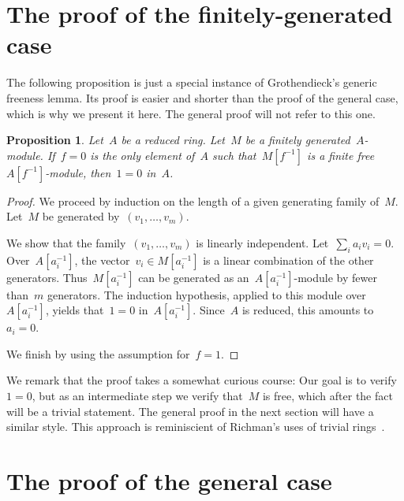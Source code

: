 \documentclass[oneside]{amsart}
\theoremstyle{definition}
\theoremstyle{plain}
\newtheorem{prop}[defn]{Proposition}
\theoremstyle{remark}
\begin{document}
\section{The proof of the finitely-generated case}

The following proposition is just a special instance of Grothendieck's generic
freeness lemma. Its proof is easier and shorter than the proof of the general
case, which is why we present it here. The general proof
will not refer to this one.

\begin{prop}Let~$A$ be a reduced ring. Let~$M$ be a finitely
generated~$A$-module. If~$f = 0$ is the only element of~$A$ such
that~$M[f^{-1}]$ is a finite free~$A[f^{-1}]$-module, then~$1 = 0$ in~$A$.
\end{prop}

\begin{proof}We proceed by induction on the length of a given generating family
of~$M$. Let~$M$ be generated by~$(v_1,\ldots,v_m)$.

We show that the family~$(v_1,\ldots,v_m)$ is linearly independent. Let~$\sum_i
a_i v_i = 0$. Over~$A[a_i^{-1}]$, the vector~$v_i \in M[a_i^{-1}]$ is a linear
combination of the other generators. Thus~$M[a_i^{-1}]$ can be generated as
an~$A[a_i^{-1}]$-module by fewer than~$m$ generators. The induction hypothesis,
applied to this module over~$A[a_i^{-1}]$, yields that~$1 = 0$ in~$A[a_i^{-1}]$. Since~$A$ is
reduced, this amounts to~$a_i = 0$.

We finish by using the assumption for~$f = 1$.
\end{proof}

We remark that the proof takes a somewhat curious course: Our goal is to
verify~$1 = 0$, but as an intermediate step we verify that~$M$ is free, which
after the fact will be a trivial statement. The general proof in the next
section will have a similar style. This approach is reminiscient of
Richman's uses of trivial rings~\cite{richman:trivial-rings}.


\section{The proof of the general case}
\end{document}
